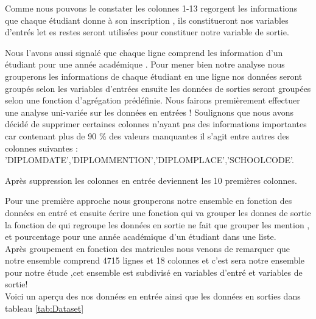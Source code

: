  Comme nous pouvons le constater les colonnes 1-13 regorgent les informations que chaque étudiant donne à son inscription , ils constitueront nos variables d'entrés let es restes seront utilisées pour constituer notre variable de sortie.

Nous l'avons aussi signalé que chaque ligne comprend les information
d'un étudiant pour une année académique . Pour mener bien notre analyse nous grouperons  les informations de chaque étudiant en une ligne nos données seront groupés selon les variables d'entrées ensuite les données de sorties seront groupées selon une fonction d'agrégation prédéfinie.
Nous fairons premièrement effectuer  une analyse uni-variée  sur les données en entrées !
Soulignons que nous avons décidé de supprimer certaines colonnes n'ayant pas des informations importantes car contenant plus de 90 \% des valeurs manquantes il s'agit entre autres des colonnes suivantes :
'DIPLOMDATE','DIPLOMMENTION','DIPLOMPLACE','SCHOOLCODE'.

Après suppression les colonnes en entrée deviennent les 10 premières colonnes.

Pour une première approche nous grouperons  notre ensemble en fonction des données en entré et ensuite écrire une fonction qui va grouper les donnes de sortie la fonction de qui regroupe les données en sortie ne fait que grouper les mention , et pourcentage pour une année académique d'un étudiant dans une liste.\\ 
Après groupement en fonction des matricules nous venons de remarquer que
notre ensemble comprend 4715 lignes et 18 colonnes et c'est sera notre ensemble pour notre étude ,cet ensemble est subdivisé en variables d'entré et variables de
sortie!\\
Voici un aperçu des nos données en entrée ainsi que les données en sorties  dans  tableau \ref{tab:Dataset}
